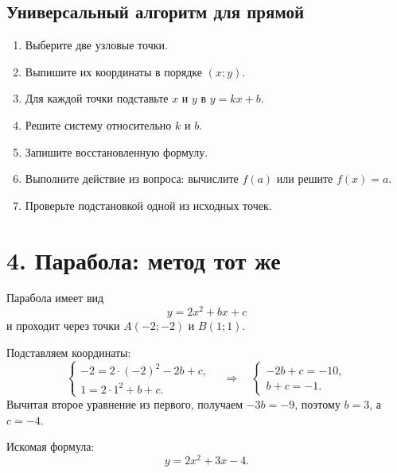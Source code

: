 \documentclass[a4paper,12pt]{article}
\begin{document}
\begin{center}
\end{center}

\subsection*{Универсальный алгоритм для прямой}
\begin{enumerate}
\item Выберите две узловые точки.
\item Выпишите их координаты в порядке $(x;y)$.
\item Для каждой точки подставьте $x$ и $y$ в $y=kx+b$.
\item Решите систему относительно $k$ и $b$.
\item Запишите восстановленную формулу.
\item Выполните действие из вопроса: вычислите $f(a)$ или решите $f(x)=a$.
\item Проверьте подстановкой одной из исходных точек.
\end{enumerate}

\section*{4. Парабола: метод тот же}
\begin{examplebox}
Парабола имеет вид
\[
y=2x^2+bx+c
\]
и проходит через точки $A(-2;-2)$ и $B(1;1)$.

Подставляем координаты:
\[
\begin{cases}
-2=2\cdot(-2)^2-2b+c,\\
1=2\cdot1^2+b+c.
\end{cases}
\quad\Longrightarrow\quad
\begin{cases}
-2b+c=-10,\\
b+c=-1.
\end{cases}
\]
Вычитая второе уравнение из первого, получаем $-3b=-9$, поэтому $b=3$, а $c=-4$.

Искомая формула:
\[
y=2x^2+3x-4.
\]
\end{examplebox}
\end{document}
